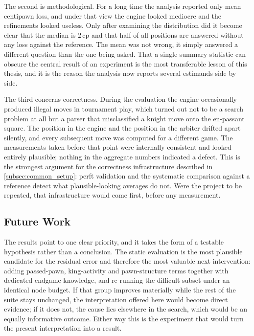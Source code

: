 The second is methodological. For a long time the analysis reported only mean
centipawn loss, and under that view the engine looked mediocre and the refinements
looked useless. Only after examining the distribution did it become clear that the
median is $2$\,cp and that half of all positions are answered without any loss
against the reference. The mean was not wrong, it simply answered a different question
than the one being asked. That a single summary statistic can obscure the central
result of an experiment is the most transferable lesson of this thesis, and it is
the reason the analysis now reports several estimands side by side.

The third concerns correctness. During the evaluation the engine occasionally
produced illegal moves in tournament play, which turned out not to be a search
problem at all but a parser that misclassified a knight move onto the en-passant
square. The position in the engine and the position in the arbiter drifted apart
silently, and every subsequent move was computed for a different game. The
measurements taken before that point were internally consistent and looked
entirely plausible; nothing in the aggregate numbers indicated a defect. This is
the strongest argument for the correctness infrastructure described in
\cref{subsec:common_setup}: perft validation and the systematic comparison against
a reference detect what plausible-looking averages do not. Were the project to be
repeated, that infrastructure would come first, before any measurement.

\subsection{Future Work}
\label{subsec:discussion_future}

The results point to one clear priority, and it takes the form of a testable
hypothesis rather than a conclusion. The static evaluation is the most plausible
candidate for the residual error and therefore the most valuable next
intervention: adding passed-pawn, king-activity and pawn-structure terms together
with dedicated endgame knowledge, and re-running the difficult subset under an
identical node budget. If that group improves materially while the rest of the
suite stays unchanged, the interpretation offered here would become direct
evidence; if it does not, the cause lies elsewhere in the search, which would be
an equally informative outcome. Either way this is the experiment that would turn
the present interpretation into a result.

